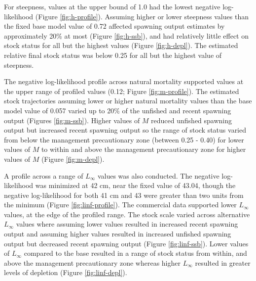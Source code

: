 \documentclass[11pt,
  english,
  letterpaper,
]{article}
\begin{document}
For steepness, values at the upper bound of 1.0 had the lowest negative log-likelihood (Figure \ref{fig:h-profile}). Assuming higher or lower steepness values than the fixed base model value of 0.72 affected spawning output estimates by approximately 20\% at most (Figure \ref{fig:h-ssb}), and had relatively little effect on stock status for all but the highest values (Figure \ref{fig:h-depl}). The estimated relative final stock status was below 0.25 for all but the highest value of steepness.

\leavevmode\tagmcend\tagstructend\par


The negative log-likelihood profile across natural mortality supported values at the upper range of profiled values (0.12; Figure \ref{fig:m-profile}). The estimated stock trajectories assuming lower or higher natural mortality values than the base model value of 0.057 varied up to 20\% of the unfished and recent spawning output (Figures \ref{fig:m-ssb}). Higher values of {\(M\)\leavevmode\tagmcend\tagstructend} reduced unfished spawning output but increased recent spawning output so the range of stock status varied from below the management precautionary zone (between 0.25 - 0.40) for lower values of {\(M\)\leavevmode\tagmcend\tagstructend} to within and above the management precautionary zone for higher values of {\(M\)\leavevmode\tagmcend\tagstructend} (Figure \ref{fig:m-depl}).

\leavevmode\tagmcend\tagstructend\par


A profile across a range of {\(L_{\infty}\)\leavevmode\tagmcend\tagstructend} values was also conducted. The negative log-likelihood was minimized at 42 cm, near the fixed value of 43.04, though the negative log-likelihood for both 41 cm and 43 were greater than two units from the minimum (Figure \ref{fig:linf-profile}). The commercial data supported lower {\(L_{\infty}\)\leavevmode\tagmcend\tagstructend} values, at the edge of the profiled range. The stock scale varied across alternative {\(L_{\infty}\)\leavevmode\tagmcend\tagstructend} values where assuming lower values resulted in increased recent spawning output and assuming higher values resulted in increased unfished spawning output but decreased recent spawning output (Figure \ref{fig:linf-ssb}). Lower values of {\(L_{\infty}\)\leavevmode\tagmcend\tagstructend} compared to the base resulted in a range of stock status from within, and above the management precautionary zone whereas higher {\(L_{\infty}\)\leavevmode\tagmcend\tagstructend} resulted in greater levels of depletion (Figure \ref{fig:linf-depl}).
\end{document}
